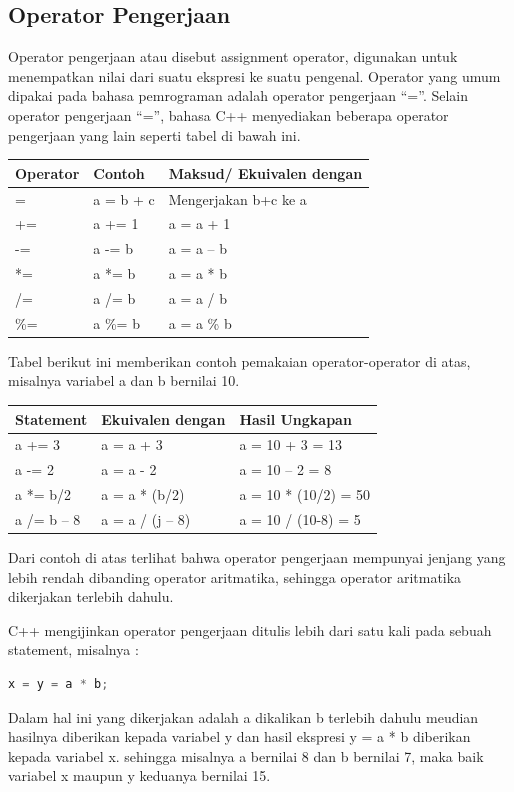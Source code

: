 \subsection{Operator Pengerjaan}\label{d-operator-pengerjaan}

Operator pengerjaan atau disebut assignment operator, digunakan untuk
menempatkan nilai dari suatu ekspresi ke suatu pengenal. Operator yang
umum dipakai pada bahasa pemrograman adalah operator pengerjaan ``=''.
Selain operator pengerjaan ``='', bahasa C++ menyediakan beberapa
operator pengerjaan yang lain seperti tabel di bawah ini.

\begin{longtable}[]{@{}lll@{}}
\toprule
Operator & Contoh & Maksud/ Ekuivalen dengan\tabularnewline
\midrule
\endhead
= & a = b + c & Mengerjakan b+c ke a\tabularnewline
+= & a += 1 & a = a + 1\tabularnewline
-= & a -= b & a = a -- b\tabularnewline
*= & a *= b & a = a * b\tabularnewline
/= & a /= b & a = a / b\tabularnewline
\%= & a \%= b & a = a \% b\tabularnewline
\bottomrule
\end{longtable}

Tabel berikut ini memberikan contoh pemakaian operator-operator di atas,
misalnya variabel a dan b bernilai 10.

\begin{longtable}[]{@{}lll@{}}
\toprule
Statement & Ekuivalen dengan & Hasil Ungkapan\tabularnewline
\midrule
\endhead
a += 3 & a = a + 3 & a = 10 + 3 = 13\tabularnewline
a -= 2 & a = a - 2 & a = 10 -- 2 = 8\tabularnewline
a *= b/2 & a = a * (b/2) & a = 10 * (10/2) = 50\tabularnewline
a /= b -- 8 & a = a / (j -- 8) & a = 10 / (10-8) = 5\tabularnewline
\bottomrule
\end{longtable}

Dari contoh di atas terlihat bahwa operator pengerjaan mempunyai jenjang
yang lebih rendah dibanding operator aritmatika, sehingga operator
aritmatika dikerjakan terlebih dahulu.

C++ mengijinkan operator pengerjaan ditulis lebih dari satu kali pada
sebuah statement, misalnya :

\begin{lstlisting}[language=c++, numbers=none]
x = y = a * b;
\end{lstlisting}

Dalam hal ini yang dikerjakan adalah a dikalikan b terlebih dahulu
meudian hasilnya diberikan kepada variabel y dan hasil ekspresi y = a *
b diberikan kepada variabel x. sehingga misalnya a bernilai 8 dan b
bernilai 7, maka baik variabel x maupun y keduanya bernilai 15.

